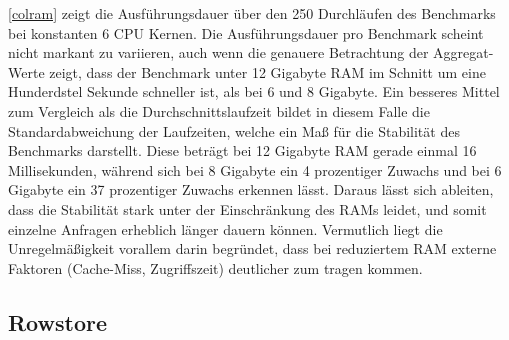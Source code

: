 \begin{figure}[H]
\end{figure}

\autoref{colram} zeigt die Ausführungsdauer über den 250 Durchläufen des Benchmarks bei konstanten 6 CPU Kernen. Die Ausführungsdauer pro Benchmark scheint nicht markant zu variieren, auch wenn die genauere Betrachtung der Aggregat-Werte zeigt, dass der Benchmark unter 12 Gigabyte RAM im Schnitt um eine Hunderdstel Sekunde schneller ist, als bei 6 und 8 Gigabyte. Ein besseres Mittel zum Vergleich als die Durchschnittslaufzeit bildet in diesem Falle die Standardabweichung der Laufzeiten, welche ein Maß für die Stabilität des Benchmarks darstellt. Diese beträgt bei 12 Gigabyte RAM gerade einmal 16 Millisekunden, während sich bei 8 Gigabyte ein 4 prozentiger Zuwachs und bei 6 Gigabyte ein 37 prozentiger Zuwachs erkennen lässt. Daraus lässt sich ableiten, dass die Stabilität stark unter der Einschränkung des RAMs leidet, und somit einzelne Anfragen erheblich länger dauern können. Vermutlich liegt die Unregelmäßigkeit vorallem darin begründet, dass bei reduziertem RAM externe Faktoren (Cache-Miss, Zugriffszeit) deutlicher zum tragen kommen. 

\subsection{Rowstore}

\begin{figure}[H]
\end{figure}

